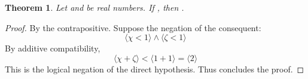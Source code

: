 \documentclass[preview]{standalone}
\newtheorem{theorem}{Theorem}
\begin{document}
\begin{theorem} %
    Let \bm{$\chi$} and \bm{$\zeta$} be real numbers. 
    If , 
    then 
    \bm{$
        \big \langle \chi \ge 1 \big \rangle 
            \lor 
        \big \langle \zeta \ge 1 \big \rangle$
    }.
\end{theorem}

\begin{proof}
    By the contrapositive.
    Suppose the negation of the consequent: 
    \begin{equation*}
        \big \langle \chi < 1 \big \rangle 
            \land 
        \big \langle \zeta < 1 \big \rangle    
    \end{equation*}    
    By additive compatibility,
    \begin{equation*}
        \Big \langle \chi + \zeta \Big \rangle 
            < 
        \Big \langle 1 + 1 \Big \rangle 
            = 
        \Big \langle 
            2
        \Big \rangle
    \end{equation*}
    This is the logical negation of the direct hypothesis. Thus concludes the proof.
\color{lightgray} \end{proof}
\end{document}
